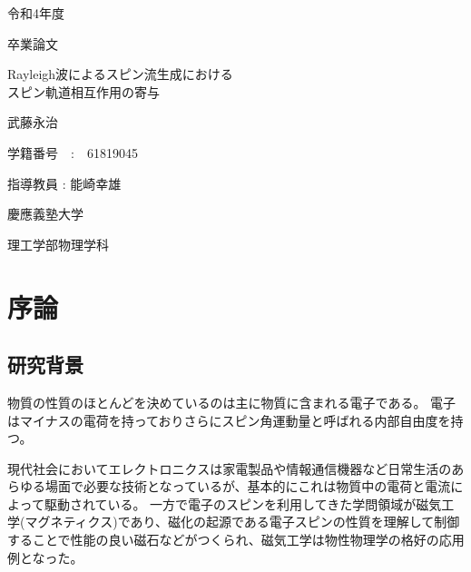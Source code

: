\documentclass[dvipdfmx,11pt]{jsreport}
\numberwithin{equation}{chapter}
\numberwithin{table}{chapter}
\begin{document}
\begin{titlepage}
	\begin{center}
		
		{\large 令和4年度}
		
		\vspace{10truept}
		
		{\large 卒業論文}
		
		\vspace*{100truept}
		
		{\huge Rayleigh波によるスピン流生成における\\スピン軌道相互作用の寄与} 
		
		\vspace{80truept}
		
		{\LARGE 武藤永治}
		
		\vspace{5truept}
		
		{\Large 学籍番号　:　61819045}
		
		\vspace{70truept}
		
		{\Large 指導教員 : 能崎幸雄}
		
		\vspace{70truept}
		
		{\Large 慶應義塾大学}
		
		\vspace{10truept}
		
		{\Large 理工学部物理学科}
		
    
		
	\end{center}
\end{titlepage}

\setcounter{tocdepth}{3}
\tableofcontents
\clearpage

\chapter{序論}
\section{研究背景}
物質の性質のほとんどを決めているのは主に物質に含まれる電子である。
電子はマイナスの電荷を持っておりさらにスピン角運動量と呼ばれる内部自由度を持つ。

現代社会においてエレクトロニクスは家電製品や情報通信機器など日常生活のあらゆる場面で必要な技術となっているが、基本的にこれは物質中の電荷と電流によって駆動されている。
一方で電子のスピンを利用してきた学問領域が磁気工学(マグネティクス)であり、磁化の起源である電子スピンの性質を理解して制御することで性能の良い磁石などがつくられ、磁気工学は物性物理学の格好の応用例となった。
\end{document}
